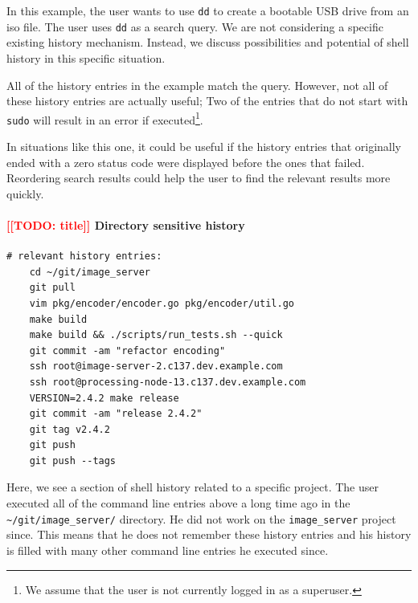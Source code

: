 \documentclass[thesis=M,english]{FITthesis}[2012/10/20]
\newcommand{\redtext}[1]{\textcolor{red}{[[#1]]}}
\begin{document}
In this example, the user wants to use \verb|dd| to create a bootable USB drive from an iso file. The user uses \verb|dd| as a search query. We are not considering a specific existing history mechanism. Instead, we discuss possibilities and potential of shell history in this specific situation.

All of the history entries in the example match the query. However, not all of these history entries are actually useful; Two of the entries that do not start with \verb|sudo| will result in an error if executed\footnote{We assume that the user is not currently logged in as a superuser.}. 

In situations like this one, it could be useful if the history entries that originally ended with a zero status code were displayed before the ones that failed. Reordering search results could help the user to find the relevant results more quickly. 

% 
%
%


\paragraph{\redtext{TODO: title} Directory sensitive history}



\begin{verbatim}
# relevant history entries:
    cd ~/git/image_server
    git pull
    vim pkg/encoder/encoder.go pkg/encoder/util.go
    make build
    make build && ./scripts/run_tests.sh --quick
    git commit -am "refactor encoding"
    ssh root@image-server-2.c137.dev.example.com
    ssh root@processing-node-13.c137.dev.example.com
    VERSION=2.4.2 make release
    git commit -am "release 2.4.2"
    git tag v2.4.2
    git push
    git push --tags
\end{verbatim}

Here, we see a section of shell history related to a specific project. The user executed all of the command line entries above a long time ago in the \verb|~/git/image_server/| directory. He did not work on the \verb|image_server| project since. This means that he does not remember these history entries and his history is filled with many other command line entries he executed since.
\end{document}

